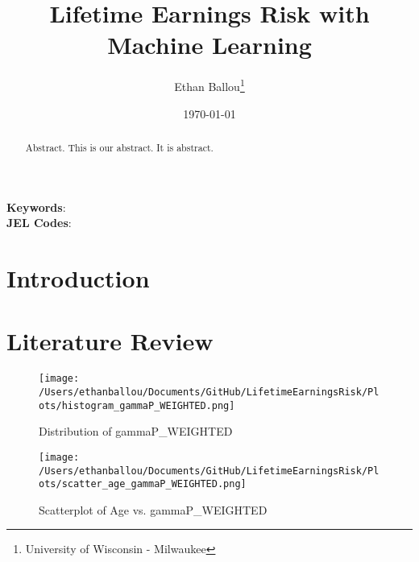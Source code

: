 \documentclass[12pt]{article}
\title{Lifetime Earnings Risk with Machine Learning}
\author{Ethan Ballou\thanks{University of Wisconsin - Milwaukee}}
\date{\today}
\begin{document}
\maketitle
\thispagestyle{empty}



\begin{abstract}
\begin{singlespace}
\noindent 
Abstract.  This is our abstract.  It is abstract.  
\end{singlespace}
\end{abstract}
\noindent
\textbf{Keywords}: \\
\textbf{JEL Codes}: \\






\clearpage
\setcounter{page}{1}





\section{Introduction}


\section{Literature Review}




















\begin{figure}[H]
    \centering
    \texttt{[image: /Users/ethanballou/Documents/GitHub/LifetimeEarningsRisk/Plots/histogram\_gammaP\_WEIGHTED.png]}
    \caption{Distribution of gammaP\_WEIGHTED}
\end{figure}



\begin{figure}[H]
    \centering
    \texttt{[image: /Users/ethanballou/Documents/GitHub/LifetimeEarningsRisk/Plots/scatter\_age\_gammaP\_WEIGHTED.png]}
    \caption{Scatterplot of Age vs. gammaP\_WEIGHTED}
\end{figure}
\end{document}
